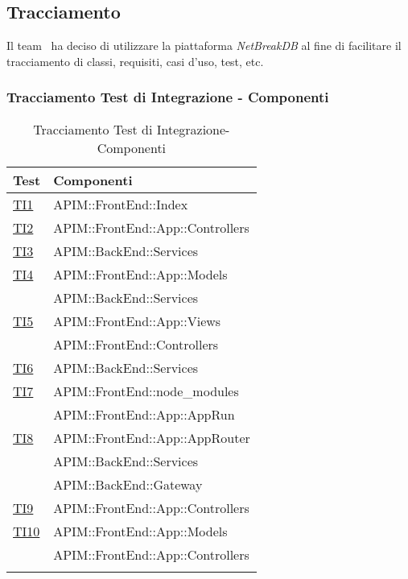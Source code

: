 \subsection{Tracciamento}
Il team \gruppo\ ha deciso di utilizzare la piattaforma \textit{NetBreakDB} al fine di facilitare il tracciamento di classi, requisiti, casi d'uso, test, etc.


\subsubsection{Tracciamento Test di Integrazione - Componenti}

\normalsize
\begin{longtable}{|>{\centering}m{5cm}|m{7cm}<{\centering}|}
	\hline \rowcolor{Gray}
	\textbf{Test} & \textbf{Componenti}\\
	\hline
	\endhead
	\hyperlink{TI1}{TI1} & APIM::FrontEnd::Index \\ \hline
	\hyperlink{TI2}{TI2} & APIM::FrontEnd::App::Controllers \\ \hline
	\hyperlink{TI3}{TI3} & APIM::BackEnd::Services \\ \hline
	\hyperlink{TI4}{TI4} & APIM::FrontEnd::App::Models\\&APIM::BackEnd::Services \\ \hline
	\hyperlink{TI5}{TI5} & APIM::FrontEnd::App::Views\\&APIM::FrontEnd::Controllers \\ \hline
	\hyperlink{TI6}{TI6} & APIM::BackEnd::Services \\ \hline
	\hyperlink{TI7}{TI7} & APIM::FrontEnd::node\_modules\\&APIM::FrontEnd::App::AppRun \\ \hline
	\hyperlink{TI8}{TI8} & APIM::FrontEnd::App::AppRouter\\&APIM::BackEnd::Services\\&APIM::BackEnd::Gateway \\ \hline
	\hyperlink{TI9}{TI9} & APIM::FrontEnd::App::Controllers \\ \hline
	\hyperlink{TI10}{TI10} & APIM::FrontEnd::App::Models\\&APIM::FrontEnd::App::Controllers \\ \hline
	
	\caption[Tracciamento Test di Integrazione-Componenti]{Tracciamento Test di Integrazione-Componenti}
	\label{tabella:ti-componenti}
\end{longtable}
\clearpage

